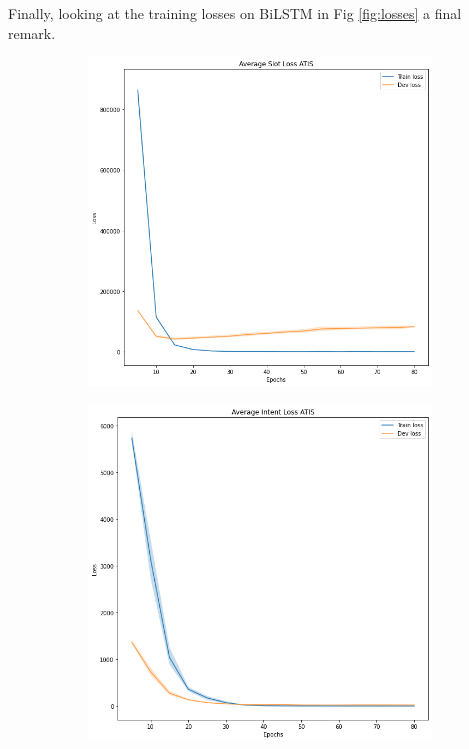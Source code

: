\documentclass[a4paper]{article}
\begin{document}
Finally, looking at the training losses on BiLSTM in Fig \ref{fig:losses} a final remark.
\begin{figure}[h!]
	\centering
	\begin{subfigure}[b]{0.20\textwidth}
		\centering
		\includegraphics[width=\textwidth]{../assets/BiLSTM_slot_loss_ATIS.png}
	\end{subfigure}	
	\hfill
	\begin{subfigure}[b]{0.20\textwidth}
		\centering
		\includegraphics[width=\textwidth]{../assets/BiLSTM_intent_loss_ATIS}

\end{subfigure}
\end{figure}
\end{document}
